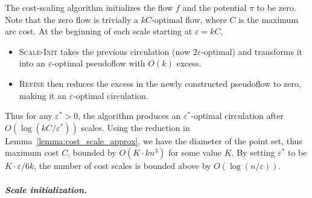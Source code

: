 \documentclass[a4paper,UKenglish]{socg-lipics-v2018}
\def\eps{\varepsilon}
\theoremstyle{plain}
\numberwithin{figure}{section}
\renewcommand{\paragraph}{\subparagraph}
\begin{document}
%

The cost-scaling algorithm initializes the flow $f$ and the potential $\pi$ to be zero.
Note that the zero flow is trivially a $kC$-optimal flow, where $C$ is the maximum arc cost.
At the beginning of each scale starting at $\eps = kC$,
\begin{itemize}
\item
\textsc{Scale-Init} takes the previous
circulation (now $2\eps$-optimal) and transforms it into an $\eps$-optimal
pseudoflow with $O(k)$ excess.
\item
\textsc{Refine} then reduces the excess in the newly constructed pseudoflow to zero, making it an $\eps$-optimal
circulation.
\end{itemize}
Thus for any $\eps^* > 0$, the algorithm produces an $\eps^*$-optimal circulation after
$O(\log(kC/\eps^*))$ scales.
%
Using the reduction in Lemma~\ref{lemma:cost_scale_approx}, we have the diameter of the point set, thus maximum cost $C$, bounded by $O(K \cdot kn^3)$ for some value $K$.  By setting $\eps^*$ to be $K \cdot \eps/6k$, the number of cost scales is bounded above by $O(\log(n/\eps))$.


\paragraph{Scale initialization.}
\end{document}
